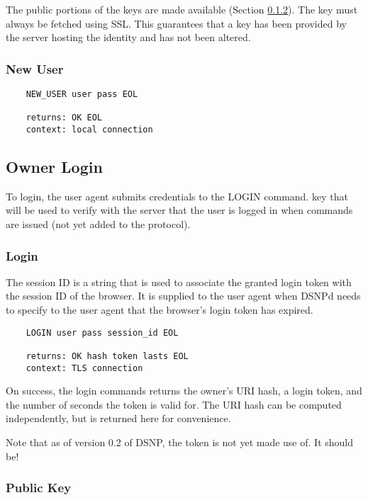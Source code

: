 \documentclass[letterpaper,11pt,oneside]{article}
\begin{document}
The public portions of the keys are made available (Section
\ref{public-key-command}). The key must always be fetched using SSL. This
guarantees that a key has been provided by the server hosting the identity and
has not been altered.

\subsubsection{New User}

\vspace{10pt}
\begin{verbatim}
    NEW_USER user pass EOL

    returns: OK EOL
    context: local connection
\end{verbatim}

\subsection{Owner Login}

To login, the user agent submits credentials to the LOGIN command. key that
will be used to verify with the server that the user is logged in when commands
are issued (not yet added to the protocol).

\subsubsection{Login}

The session ID is a string that is used to associate the granted login token
with the session ID of the browser. It is supplied to the user agent when DSNPd
needs to specify to the user agent that the browser's login token has expired.

\vspace{10pt}
\begin{verbatim}
    LOGIN user pass session_id EOL

    returns: OK hash token lasts EOL
    context: TLS connection
\end{verbatim}
\vspace{10pt}

On success, the login commands returns the owner's URI hash, a login token, and
the number of seconds the token is valid for. The URI hash can be computed
independently, but is returned here for convenience.

Note that as of version 0.2 of DSNP, the token is not yet made use of. It
should be!

\subsubsection{Public Key}
\label{public-key-command}
\end{document}
